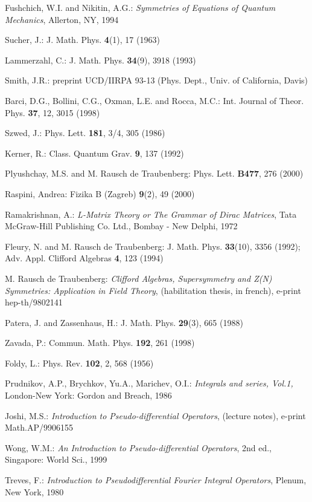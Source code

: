 \documentclass[a4paper,a4paper]{article}
\begin{document}
\begin{thebibliography}{99}
 Fushchich, W.I. and Nikitin, A.G.: \textit{Symmetries of
Equations of Quantum Mechanics}, Allerton, NY, 1994

 Sucher, J.: J. Math. Phys. \textbf{4}(1), 17 (1963)

 Lammerzahl, C.: J. Math. Phys. \textbf{34}(9), 3918 (1993)

 Smith, J.R.: preprint UCD/IIRPA 93-13 (Phys. Dept., Univ. of
California, Davis)

 Barci, D.G., Bollini, C.G., Oxman, L.E. and Rocca, M.C.: Int.
Journal of Theor. Phys. \textbf{37}, 12, 3015 (1998)

 Szwed, J.: Phys. Lett. \textbf{181}, 3/4, 305 (1986)

 Kerner, R.: Class. Quantum Grav. \textbf{9}, 137 (1992)

 Plyushchay, M.S. and M. Rausch de Traubenberg: Phys. Lett. 
\textbf{B477}, 276 (2000)

 Raspini, Andrea: Fizika B (Zagreb) \textbf{9}(2), 49 (2000)

 Ramakrishnan, A.: \textit{L-Matrix Theory or The Grammar of
Dirac Matrices}, Tata McGraw-Hill Publishing Co. Ltd., Bombay - New Delphi,
1972

 Fleury, N. and M. Rausch de Traubenberg: J. Math. Phys. 
\textbf{33}(10), 3356 (1992); Adv. Appl. Clifford Algebras \textbf{4}, 123
(1994)

 M. Rausch de Traubenberg: \textit{Clifford Algebras,
Supersymmetry and Z(N) Symmetries: Application in Field Theory},
(habilitation thesis, in french), e-print hep-th/9802141

 Patera, J. and Zassenhaus, H.: J. Math. Phys. \textbf{29}(3),
665 (1988)

 Zavada, P.: Commun. Math. Phys. \textbf{192}, 261 (1998)

 Foldy, L.: Phys. Rev. \textbf{102}, 2, 568 (1956)

 Prudnikov, A.P., Brychkov, Yu.A., Marichev, O.I.: \textit{%
Integrals and series, Vol.1,} London-New York: Gordon and Breach, 1986

 Joshi, M.S.: \textit{Introduction to Pseudo-differential
Operators}, (lecture notes), e-print Math.AP/9906155

 Wong, W.M.: \textit{An} \textit{Introduction to
Pseudo-differential Operators}, 2nd ed., Singapore: World Sci., 1999

 Treves, F.: \textit{Introduction to Pseudodifferential Fourier
Integral Operators}, Plenum, New York, 1980
\end{thebibliography}
\end{document}
